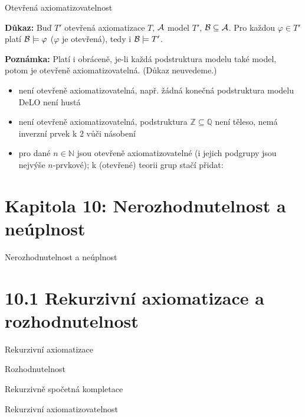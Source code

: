 \documentclass{beamer}
\begin{document}
\begin{frame}{Otevřená axiomatizovatelnost}

    \smallskip

    
    \textbf{Důkaz:}
    Buď $T'$ otevřená axiomatizace $T$, $\mathcal{A}$ model $T'$, $\mathcal{B}\subseteq\mathcal{A}$. Pro každou $\varphi\in T'$ platí $\mathcal{B}\models\varphi$ ($\varphi$ je otevřená), tedy i $\mathcal{B}\models T'$.  
    \hfill\qedsymbol

    \textbf{Poznámka:} Platí i obráceně, je-li každá podstruktura modelu také model, potom je otevřeně axiomatizovatelná. (Důkaz neuvedeme.)

    \begin{itemize}
        \item {} není otevřeně axiomatizovatelná, např. žádná konečná podstruktura modelu DeLO není hustá
        \item {} není otevřeně axiomatizovatelná, podstruktura $\mathbb Z\subseteq\mathbb Q$ není těleso, nemá inverzní prvek k $2$ vůči násobení
        \item pro dané $n\in\mathbb N$ jsou  otevřeně axiomatizovatelné (i jejich podgrupy jsou nejvýše $n$-prvkové); k (otevřené) teorii grup stačí přidat: 
    \end{itemize}

\end{frame}


\section{\sc Kapitola 10: Nerozhodnutelnost a neúplnost}


\begin{frame}{Nerozhodnutelnost a neúplnost}

    

\end{frame}


\section{10.1 Rekurzivní axiomatizace a rozhodnutelnost}


\begin{frame}{Rekurzivní axiomatizace}

    

\end{frame}


\begin{frame}{Rozhodnutelnost}
    

\end{frame}


\begin{frame}{Rekurzivně spočetná kompletace}

    

\end{frame}


\begin{frame}{Rekurzivní axiomatizovatelnost}

    

\end{frame}
\end{document}
